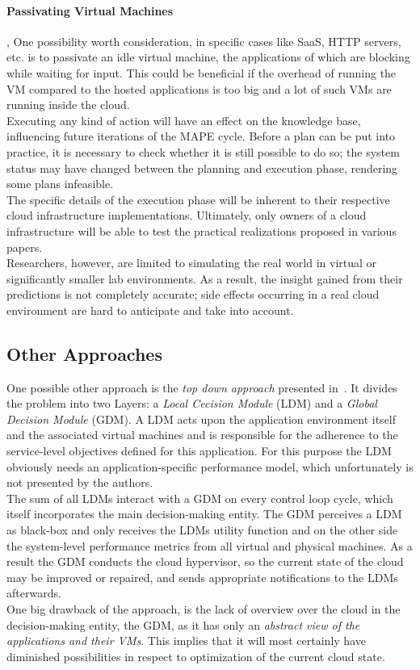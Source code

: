 \documentclass[a4paper]{llncs}
\begin{document}
\paragraph{Passivating Virtual Machines}, One possibility worth consideration, in specific cases like SaaS, HTTP servers, etc. is to passivate an idle virtual machine, the applications of which are blocking while waiting for input. This could be beneficial if the overhead of running the VM compared to the hosted applications is too big and a lot of such VMs are running inside the cloud.\\

Executing any kind of action will have an effect on the knowledge base, influencing future iterations of the MAPE cycle. Before a plan can be put into practice, it is necessary to check whether it is still possible to do so; the system status may have changed between the planning and execution phase, rendering some plans infeasible.\\

The specific details of the execution phase will be inherent to their respective cloud infrastructure implementations. Ultimately, only owners of a cloud infrastructure will be able to test the practical realizations proposed in various papers.\\
Researchers, however, are limited to simulating the real world in virtual or significantly smaller lab environments. As a result, the insight gained from their predictions is not completely accurate; side effects occurring in a real cloud environment are hard to anticipate and take into account.

\subsection{Other Approaches}
One possible other approach is the \textit{top down approach} presented in~\cite{Nguyen09}. It divides the problem into two Layers: a \textit{Local Cecision Module} (LDM) and a \textit{Global Decision Module} (GDM). A LDM acts upon the application environment itself and the associated virtual machines and is responsible for the adherence to the service-level objectives defined for this application. For this purpose the LDM obviously needs an application-specific performance model, which unfortunately is not presented by the authors.\\
The sum of all LDMs interact with a GDM on every control loop cycle, which itself incorporates the main decision-making entity. The GDM perceives a LDM as black-box and only receives the LDMs utility function and on the other side the system-level performance metrics from all virtual and physical machines. As a result the GDM conducts the cloud hypervisor, so the current state of the cloud may be improved or repaired, and sends appropriate notifications to the LDMs afterwards.\\
One big drawback of the approach, is the lack of overview over the cloud in the decision-making entity, the GDM, as it has only an \textit{abstract view of the applications and their VMs}. This implies that it will most certainly have diminished possibilities in respect to optimization of the current cloud state.\\
\end{document}
